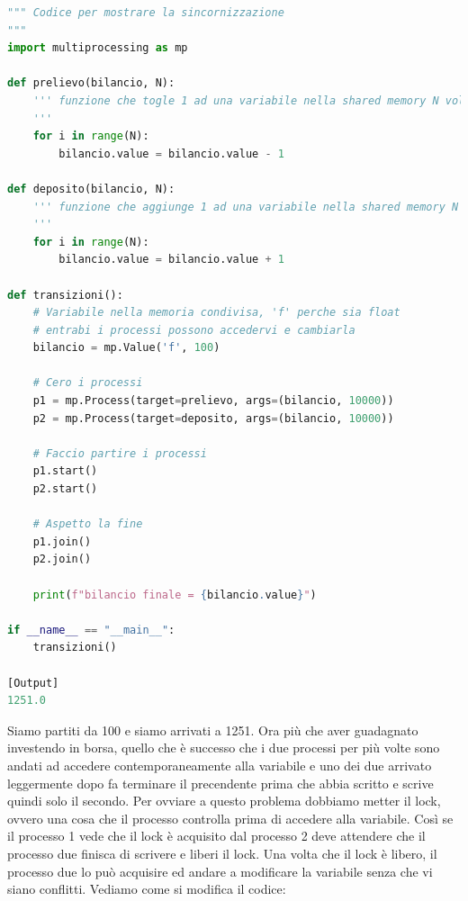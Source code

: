\documentclass[10pt,a4paper]{article}
\begin{document}
\begin{lstlisting}[language=Python]
""" Codice per mostrare la sincornizzazione
"""
import multiprocessing as mp

def prelievo(bilancio, N):
    ''' funzione che togle 1 ad una variabile nella shared memory N volte
    '''
    for i in range(N):
        bilancio.value = bilancio.value - 1

def deposito(bilancio, N):
    ''' funzione che aggiunge 1 ad una variabile nella shared memory N volte
    '''
    for i in range(N):
        bilancio.value = bilancio.value + 1

def transizioni():
    # Variabile nella memoria condivisa, 'f' perche sia float
    # entrabi i processi possono accedervi e cambiarla
    bilancio = mp.Value('f', 100)

    # Cero i processi
    p1 = mp.Process(target=prelievo, args=(bilancio, 10000))
    p2 = mp.Process(target=deposito, args=(bilancio, 10000))

    # Faccio partire i processi
    p1.start()
    p2.start()

    # Aspetto la fine
    p1.join()
    p2.join()

    print(f"bilancio finale = {bilancio.value}")

if __name__ == "__main__":
    transizioni()

[Output]
1251.0
\end{lstlisting}
Siamo partiti da 100 e siamo arrivati a 1251. Ora più che aver guadagnato investendo in borsa, quello che è successo che i due processi per più volte sono andati ad accedere contemporaneamente alla variabile e uno dei due arrivato leggermente dopo fa terminare il precendente prima che abbia scritto e scrive quindi solo il secondo. Per ovviare a questo problema dobbiamo metter il lock, ovvero una cosa che il processo controlla prima di accedere alla variabile. Così se il processo 1 vede che il lock è acquisito dal processo 2 deve attendere che il processo due finisca di scrivere e liberi il lock. Una volta che il lock è libero, il processo due lo può acquisire ed andare a modificare la variabile senza che vi siano conflitti. Vediamo come si modifica il codice:
\end{document}
